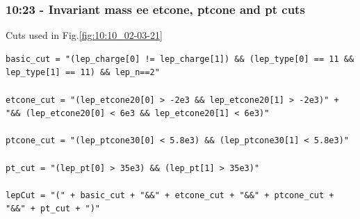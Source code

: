 \subsubsection*{10:23 - Invariant mass ee etcone, ptcone and pt cuts}
Cuts used in Fig.\ref{fig:10:10_02-03-21}
\begin{lstlisting}
basic_cut = "(lep_charge[0] != lep_charge[1]) && (lep_type[0] == 11 && lep_type[1] == 11) && lep_n==2"

etcone_cut = "(lep_etcone20[0] > -2e3 && lep_etcone20[1] > -2e3)" + "&& (lep_etcone20[0] < 6e3 && lep_etcone20[1] < 6e3)"

ptcone_cut = "(lep_ptcone30[0] < 5.8e3) && (lep_ptcone30[1] < 5.8e3)"

pt_cut = "(lep_pt[0] > 35e3) && (lep_pt[1] > 35e3)"

lepCut = "(" + basic_cut + "&&" + etcone_cut + "&&" + ptcone_cut + "&&" + pt_cut + ")"
\end{lstlisting}
